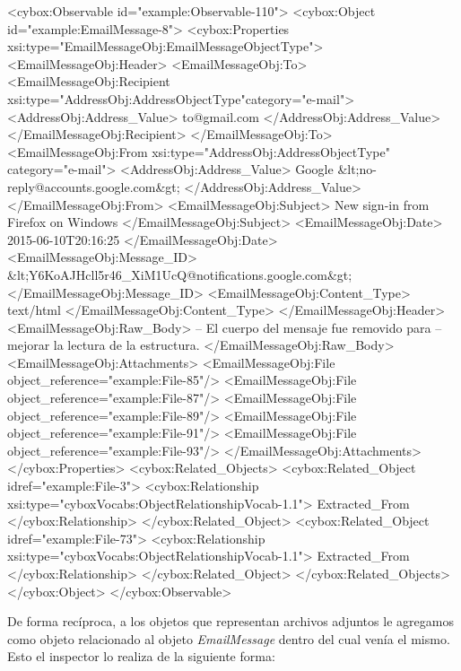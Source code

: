 \begin{xml}
<cybox:Observable id="example:Observable-110">
  <cybox:Object id="example:EmailMessage-8">
    <cybox:Properties xsi:type="EmailMessageObj:EmailMessageObjectType">
      <EmailMessageObj:Header>
        <EmailMessageObj:To>
          <EmailMessageObj:Recipient
    xsi:type="AddressObj:AddressObjectType"category="e-mail">
            <AddressObj:Address_Value>
                to@gmail.com
            </AddressObj:Address_Value>
          </EmailMessageObj:Recipient>
        </EmailMessageObj:To>
        <EmailMessageObj:From xsi:type="AddressObj:AddressObjectType" category="e-mail">
          <AddressObj:Address_Value>
            Google &lt;no-reply@accounts.google.com&gt;
          </AddressObj:Address_Value>
        </EmailMessageObj:From>
        <EmailMessageObj:Subject>
            New sign-in from Firefox on Windows
        </EmailMessageObj:Subject>
        <EmailMessageObj:Date>
            2015-06-10T20:16:25
        </EmailMessageObj:Date>
        <EmailMessageObj:Message_ID>
    &lt;Y6KoAJHcll5r46_XiM1UcQ@notifications.google.com&gt;
        </EmailMessageObj:Message_ID>
        <EmailMessageObj:Content_Type>
          text/html
        </EmailMessageObj:Content_Type>
      </EmailMessageObj:Header>
      <EmailMessageObj:Raw_Body>
        -- El cuerpo del mensaje fue removido para 
        -- mejorar la lectura de la estructura.
      </EmailMessageObj:Raw_Body>
      <EmailMessageObj:Attachments>
        <EmailMessageObj:File object_reference="example:File-85"/>
        <EmailMessageObj:File object_reference="example:File-87"/>
        <EmailMessageObj:File object_reference="example:File-89"/>
        <EmailMessageObj:File object_reference="example:File-91"/>
        <EmailMessageObj:File object_reference="example:File-93"/>
      </EmailMessageObj:Attachments>
    </cybox:Properties>
    <cybox:Related_Objects>
      <cybox:Related_Object idref="example:File-3">
        <cybox:Relationship xsi:type="cyboxVocabs:ObjectRelationshipVocab-1.1">
          Extracted_From
        </cybox:Relationship>
      </cybox:Related_Object>
      <cybox:Related_Object idref="example:File-73">
        <cybox:Relationship xsi:type="cyboxVocabs:ObjectRelationshipVocab-1.1">
          Extracted_From
        </cybox:Relationship>
      </cybox:Related_Object>
    </cybox:Related_Objects>
  </cybox:Object>
</cybox:Observable>
\end{xml}

De forma recíproca, a los objetos que representan archivos adjuntos le agregamos como objeto relacionado al objeto \emph{EmailMessage} dentro del cual venía el mismo. Esto el inspector lo realiza de la siguiente forma:
\newline

